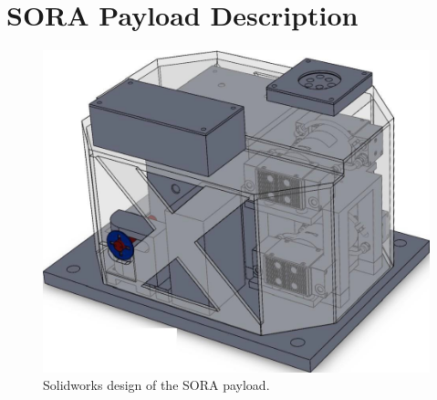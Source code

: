\section{SORA Payload Description}
\label{sec:Hardware}

\begin{figure}[!ht]
\begin{center}
\includegraphics[width=1\textwidth]{./Figures/payload_1.jpg}
\caption{Solidworks design of the SORA payload.}
\label{fig:payload} 
\end{center}
\end{figure}